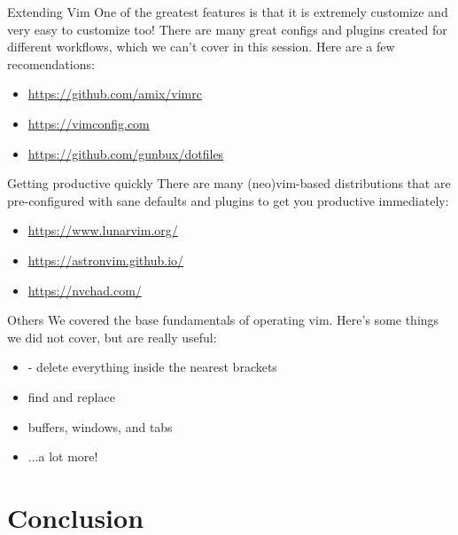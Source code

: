 \documentclass[12pt]{beamer}
\begin{document}
\begin{frame}{Extending Vim}
    One of the greatest features is that it is extremely customize and very easy to customize too!
    There are many great configs and plugins created for different workflows, which we can't cover in this
    session. Here are a few recomendations:

    \begin{itemize}
        \item \url{https://github.com/amix/vimrc}
        \item \url{https://vimconfig.com}
        \item \url{https://github.com/gunbux/dotfiles}
    \end{itemize}{}
\end{frame}{}

\begin{frame}{Getting productive quickly}
    There are many (neo)vim-based distributions that are pre-configured with sane defaults and plugins to get you productive immediately:

    \begin{itemize}
        \item \url{https://www.lunarvim.org/}
        \item \url{https://astronvim.github.io/}
        \item \url{https://nvchad.com/}
    \end{itemize}
\end{frame}{}

\begin{frame}{Others}
    We covered the base fundamentals of operating vim. Here's some things we did not cover, but are really
    useful:

    \begin{itemize}
        \item {} - delete everything inside the nearest brackets
        \item find and replace
        \item buffers, windows, and tabs
        \item ...a lot more!
    \end{itemize}{}
\end{frame}{}

\section{Conclusion}
\subsection{}
\end{document}
